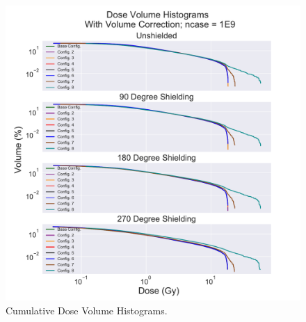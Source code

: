 \documentclass[12pt]{article}
\begin{document}
\begin{figure}[!ht]
	\centering
	\includegraphics[scale=0.6]{cumulative_dose_volume_histogram}
	\caption{Cumulative Dose Volume Histograms.}
\end{figure}
\end{document}
